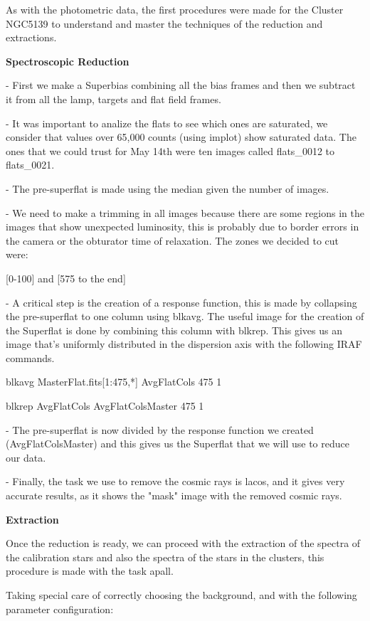 \documentclass[english]{article}
\begin{document}
As with the photometric data, the first procedures were made for the Cluster NGC5139 to understand and master the techniques of the reduction and extractions.

\textbf{Spectroscopic Reduction}

- First we make a Superbias combining all the bias frames and then we subtract it from all the lamp, targets and flat field frames.

- It was important to analize the flats to see which ones are saturated, we consider that values over 65,000 counts (using implot) show saturated data. The ones that we could trust for May 14th were ten images called flats\_0012 to flats\_0021.

- The pre-superflat is made using the median given the number of images.

- We need to make a trimming in all images because there are some regions in the images that show unexpected luminosity, this is probably due to border errors in the camera or the obturator time of relaxation. The zones we decided to cut were:

[0-100] and [575 to the end]

- A critical step is the creation of a response function, this is made by collapsing the pre-superflat to one column using blkavg. The useful image for the creation of the Superflat is done by combining this column with blkrep. This gives us an image that's uniformly distributed in the dispersion axis with the following IRAF commands.

blkavg MasterFlat.fits[1:475,*] AvgFlatCols 475 1

blkrep AvgFlatCols AvgFlatColsMaster 475 1

- The pre-superflat is now divided by the response function we created (AvgFlatColsMaster) and this gives us the Superflat that we will use to reduce our data.

- Finally, the task we use to remove the cosmic rays is lacos, and it gives very accurate results, as it shows the "mask" image with the removed cosmic rays.

\textbf{Extraction}

Once the reduction is ready, we can proceed with the extraction of the spectra of the calibration stars and also the spectra of the stars in the clusters, this procedure is made with the task apall.

Taking special care of correctly choosing the background, and with the following parameter configuration:
\end{document}

